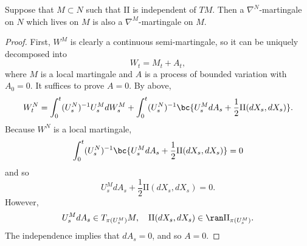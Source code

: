 \begin{cor}
    Suppose that $M \subset N$ such that $\mathrm{II}$ is independent of $TM$. Then a $\nabla^N$-martingale on $N$ which lives on $M$ is also a $\nabla^M$-martingale on $M$.
\end{cor}
\begin{proof}
    First, $W^M$ is clearly a continuous semi-martingale, so it can be uniquely decomposed into
    \begin{equation*}
        W_t = M_t + A_t,
    \end{equation*}
    where $M$ is a local martingale and $A$ is a process of bounded variation with $A_0 = 0$. It suffices to prove $A = 0$. By above,
    \begin{equation*}
         W^N_t = \int_0^t (U^N_s)^{-1}U^M_s d W^M_s +  \int_0^t(U^N_s)^{-1}\bc{ U_s^MdA_s + \frac{1}{2}\mathrm{II}(dX_s,dX_s)}.
    \end{equation*}
    Because $W^N$ is a local martingale,
    \begin{equation*}
        \int_0^t(U^N_s)^{-1}\bc{ U_s^MdA_s + \frac{1}{2}\mathrm{II}(dX_s,dX_s)} = 0
    \end{equation*}
    and so
    \begin{equation*}
        U_s^MdA_s + \frac{1}{2}\mathrm{II}(dX_s,dX_s) = 0.
    \end{equation*}
    However,
    \begin{equation*}
        U_s^MdA_s \in T_{\pi(U_s^M)}M,\quad \mathrm{II}(dX_s,dX_s) \in \ran \mathrm{II}_{\pi(U_s^M)}.
    \end{equation*}
    The independence implies that $dA_s = 0$, and so $A = 0$. \qedhere
\end{proof}

